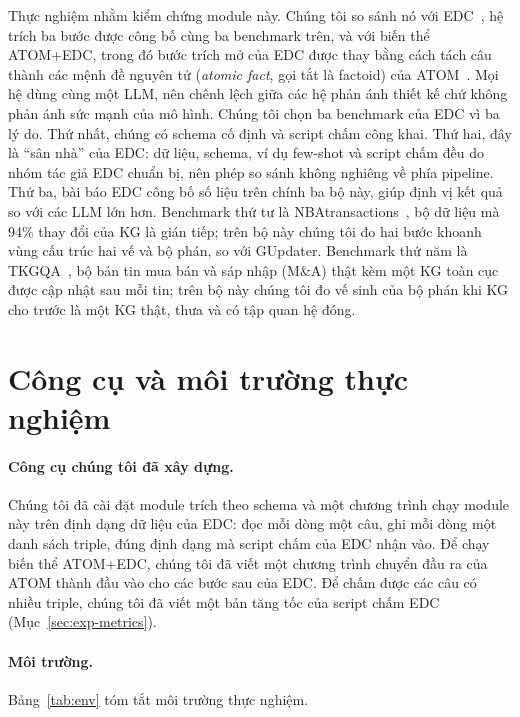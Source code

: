 Thực nghiệm nhằm kiểm chứng module này. Chúng tôi so sánh nó với EDC~\cite{zhang2024edc}, hệ trích ba bước được công bố cùng ba benchmark trên, và với biến thể ATOM+EDC, trong đó bước trích mở của EDC được thay bằng cách tách câu thành các mệnh đề nguyên tử (\textit{atomic fact}, gọi tắt là factoid) của ATOM~\cite{lairgi2025atom}.
Mọi hệ dùng cùng một LLM, nên chênh lệch giữa các hệ phản ánh thiết kế chứ không phản ánh sức mạnh của mô hình.
Chúng tôi chọn ba benchmark của EDC vì ba lý do. Thứ nhất, chúng có schema cố định và script chấm công khai.
Thứ hai, đây là ``sân nhà'' của EDC: dữ liệu, schema, ví dụ few-shot và script chấm đều do nhóm tác giả EDC chuẩn bị, nên phép so sánh không nghiêng về phía pipeline.
Thứ ba, bài báo EDC công bố số liệu trên chính ba bộ này, giúp định vị kết quả so với các LLM lớn hơn.
Benchmark thứ tư là NBAtransactions~\cite{tang2019gupdate}, bộ dữ liệu mà 94\% thay đổi của KG là gián tiếp; trên bộ này chúng tôi đo hai bước khoanh vùng cấu trúc hai vế và bộ phán, so với GUpdater.
Benchmark thứ năm là TKGQA~\cite{ong2023tkgqa}, bộ bản tin mua bán và sáp nhập (M\&A) thật kèm một KG toàn cục được cập nhật sau mỗi tin; trên bộ này chúng tôi đo vế sinh của bộ phán khi KG cho trước là một KG thật, thưa và có tập quan hệ đóng.

\section{Công cụ và môi trường thực nghiệm}\label{sec:exp-env}

\paragraph*{Công cụ chúng tôi đã xây dựng.}
Chúng tôi đã cài đặt module trích theo schema và một chương trình chạy module này trên định dạng dữ liệu của EDC: đọc mỗi dòng một câu, ghi mỗi dòng một danh sách triple, đúng định dạng mà script chấm của EDC nhận vào.
Để chạy biến thể ATOM+EDC, chúng tôi đã viết một chương trình chuyển đầu ra của ATOM thành đầu vào cho các bước sau của EDC.
Để chấm được các câu có nhiều triple, chúng tôi đã viết một bản tăng tốc của script chấm EDC (Mục~\ref{sec:exp-metrics}).

\paragraph*{Môi trường.}
Bảng~\ref{tab:env} tóm tắt môi trường thực nghiệm.

